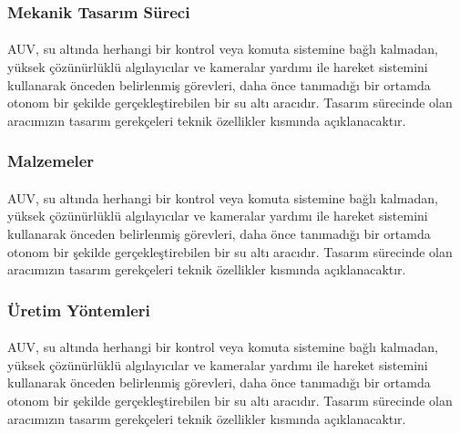 \documentclass[12pt]{article}
\begin{document}
\subsubsection{Mekanik Tasarım Süreci}

\begin{justify}
\paragraph{} AUV, su altında herhangi bir kontrol veya komuta sistemine bağlı kalmadan, yüksek çözünürlüklü algılayıcılar ve kameralar yardımı ile hareket sistemini kullanarak önceden belirlenmiş görevleri, daha önce tanımadığı bir ortamda otonom bir şekilde gerçekleştirebilen bir su altı aracıdır. Tasarım sürecinde olan aracımızın tasarım gerekçeleri teknik özellikler kısmında açıklanacaktır.
\end{justify}

\subsubsection{Malzemeler}

\begin{justify}
\paragraph{} AUV, su altında herhangi bir kontrol veya komuta sistemine bağlı kalmadan, yüksek çözünürlüklü algılayıcılar ve kameralar yardımı ile hareket sistemini kullanarak önceden belirlenmiş görevleri, daha önce tanımadığı bir ortamda otonom bir şekilde gerçekleştirebilen bir su altı aracıdır. Tasarım sürecinde olan aracımızın tasarım gerekçeleri teknik özellikler kısmında açıklanacaktır.
\end{justify}

\subsubsection{Üretim Yöntemleri}

\begin{justify}
\paragraph{} AUV, su altında herhangi bir kontrol veya komuta sistemine bağlı kalmadan, yüksek çözünürlüklü algılayıcılar ve kameralar yardımı ile hareket sistemini kullanarak önceden belirlenmiş görevleri, daha önce tanımadığı bir ortamda otonom bir şekilde gerçekleştirebilen bir su altı aracıdır. Tasarım sürecinde olan aracımızın tasarım gerekçeleri teknik özellikler kısmında açıklanacaktır.
\end{justify}
\end{document}
